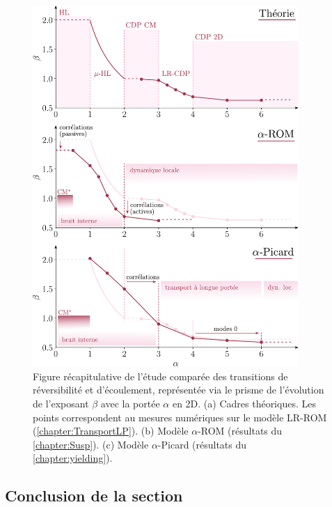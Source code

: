 \begin{figure}[H]
	\centering
	\includegraphics[width=0.9\textwidth]{Chapitre5/Figures/FigRecap.pdf}
	\caption{Figure récapitulative de l'étude comparée des transitions de réversibilité et d'écoulement, représentée via le prisme de l'évolution de l'exposant $\beta$ avec la portée $\alpha$ en 2D. (a) Cadres théoriques. Les points correspondent au mesures numériques sur le modèle LR-ROM (\autoref{chapter:TransportLP}). (b) Modèle $\alpha$-ROM (résultats du \autoref{chapter:Susp}). (c) Modèle $\alpha$-Picard (résultats du \autoref{chapter:yielding}).}
	\label{fig:Recap}
\end{figure}

\subsection{Conclusion de la section}

